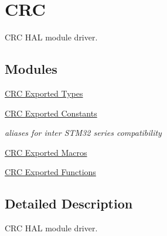 \hypertarget{group___c_r_c}{}\section{C\+RC}
\label{group___c_r_c}


C\+RC H\+AL module driver.  


\subsection*{Modules}
\begin{DoxyCompactItemize}
\item 
\hyperlink{group___c_r_c___exported___types}{C\+R\+C Exported Types}
\item 
\hyperlink{group___c_r_c___exported___constants}{C\+R\+C Exported Constants}
\begin{DoxyCompactList}\small\item\em aliases for inter S\+T\+M32 series compatibility \end{DoxyCompactList}\item 
\hyperlink{group___c_r_c___exported___macros}{C\+R\+C Exported Macros}
\item 
\hyperlink{group___c_r_c___exported___functions}{C\+R\+C Exported Functions}
\end{DoxyCompactItemize}


\subsection{Detailed Description}
C\+RC H\+AL module driver. 

